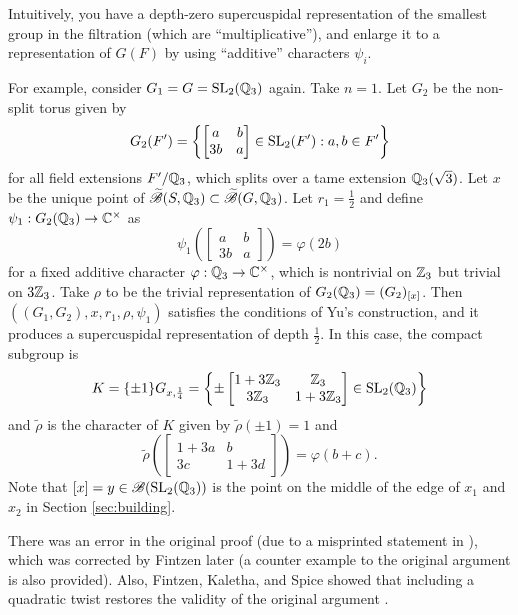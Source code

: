Intuitively, you have a depth-zero supercuspidal representation of the smallest group in the filtration (which are ``multiplicative''), and enlarge it to a representation of $G(F)$ by using ``additive'' characters $\psi_i$.

For example, consider $G_1 = G = \mathrm{SL}_2(\mathbb{Q}_3)$ again.
Take $n = 1$.
Let $G_2$ be the non-split torus given by
\[
    G_2(F') = \left\{ \begin{bmatrix}
        a & b \\ 3b & a
    \end{bmatrix} \in \mathrm{SL}_2(F') : a, b \in F'\right\}
\]
for all field extensions $F'/ \mathbb{Q}_3$, which splits over a tame extension $\mathbb{Q}_3(\sqrt{3})$.
Let $x$ be the unique point of $\widetilde{\mathscr{B}}(S, \mathbb{Q}_3) \subset \widetilde{\mathscr{B}}(G, \mathbb{Q}_3)$.
Let $r_1 = \frac{1}{2}$ and define $\psi_1: G_2(\mathbb{Q}_3)  \to \mathbb{C}^\times$ as 
\[
    \psi_1 \left(\begin{bmatrix}
        a & b \\ 3b & a
    \end{bmatrix}\right) = \varphi(2b)
\]
for a fixed additive character $\varphi: \mathbb{Q}_3 \to \mathbb{C}^\times$, which is nontrivial on $\mathbb{Z}_3$ but trivial on $3 \mathbb{Z}_3$.
Take $\rho$ to be the trivial representation of $G_2(\mathbb{Q}_3) = (G_{2})_{[x]}$.
Then $((G_1, G_2), x, r_1, \rho, \psi_1)$ satisfies the conditions of Yu's construction, and it produces a supercuspidal representation of depth $\frac{1}{2}$.
In this case, the compact subgroup is
\[
    K = \{\pm 1 \} G_{x, \frac{1}{4}} = \left\{\pm\begin{bmatrix}
        1 + 3\mathbb{Z}_3 & \mathbb{Z}_3 \\ 3\mathbb{Z}_3 & 1 + 3\mathbb{Z}_3
    \end{bmatrix} \in \mathrm{SL}_2(\mathbb{Q}_3) \right\}
\]
and $\tilde{\rho}$ is the character of $K$ given by $\tilde{\rho}(\pm 1) = 1$ and
\[
    \tilde{\rho} \left( \begin{bmatrix}
        1 + 3a & b \\ 3c & 1 + 3d
    \end{bmatrix}\right) = \varphi(b + c).
\]
Note that $[x] = y \in \mathscr{B}(\mathrm{SL}_2(\mathbb{Q}_3))$ is the point on the middle of the edge of $x_1$ and $x_2$ in Section \ref{sec:building}.


There was an error in the original proof \cite{yu2001construction} (due to a misprinted statement in \cite{gerardin1977weil}), which was corrected by Fintzen \cite{fintzen2021representations} later (a counter example to the original argument is also provided).
Also, Fintzen, Kaletha, and Spice showed that including a quadratic twist restores the validity of the original argument \cite{fintzen2023twisted}.

